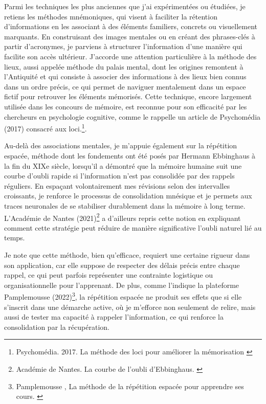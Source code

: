 \documentclass[11pt,a4paper]{report}
\begin{document}
Parmi les techniques les plus anciennes que j’ai expérimentées ou étudiées, je retiens les méthodes mnémoniques, qui visent à faciliter la rétention d’informations en les associant à des éléments familiers, concrets ou visuellement marquants. En construisant des images mentales ou en créant des phrases-clés à partir d’acronymes, je parviens à structurer l’information d’une manière qui facilite son accès ultérieur. J’accorde une attention particulière à la méthode des lieux, aussi appelée méthode du palais mental, dont les origines remontent à l’Antiquité et qui consiste à associer des informations à des lieux bien connus dans un ordre précis, ce qui permet de naviguer mentalement dans un espace fictif pour retrouver les éléments mémorisés. Cette technique, encore largement utilisée dans les concours de mémoire, est reconnue pour son efficacité par les chercheurs en psychologie cognitive, comme le rappelle un article de Psychomédia (2017) consacré aux loci.\footnote{Psychomédia. 2017. La méthode des loci pour améliorer la mémorisation \cite{psychomédia}}.

Au-delà des associations mentales, je m’appuie également sur la répétition espacée, méthode dont les fondements ont été posés par Hermann Ebbinghaus à la fin du XIXe siècle, lorsqu’il a démontré que la mémoire humaine suit une courbe d’oubli rapide si l’information n’est pas consolidée par des rappels réguliers. En espaçant volontairement mes révisions selon des intervalles croissants, je renforce le processus de consolidation mnésique et je permets aux traces neuronales de se stabiliser durablement dans la mémoire à long terme. L’Académie de Nantes (2021)\footnote{Académie de Nantes. La courbe de l'oubli d'Ebbinghaus. \cite{ebbinghaus}} a d’ailleurs repris cette notion en expliquant comment cette stratégie peut réduire de manière significative l’oubli naturel lié au temps.

Je note que cette méthode, bien qu’efficace, requiert une certaine rigueur dans son application, car elle suppose de respecter des délais précis entre chaque rappel, ce qui peut parfois représenter une contrainte logistique ou organisationnelle pour l’apprenant. De plus, comme l’indique la plateforme Pamplemousse (2022)\footnote{Pamplemousse , La méthode de la répétition espacée pour apprendre ses cours. \cite{pamplemousse}}, la répétition espacée ne produit ses effets que si elle s’inscrit dans une démarche active, où je m’efforce non seulement de relire, mais aussi de tester ma capacité à rappeler l’information, ce qui renforce la consolidation par la récupération.
\end{document}
